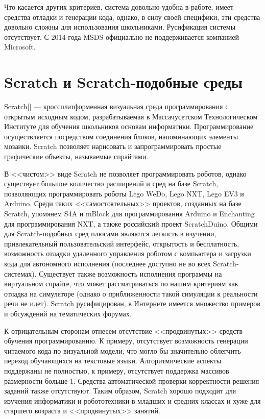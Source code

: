 \documentclass[a5paper]{article}
\begin{document}
Что касается других критериев, система довольно удобна в работе, имеет средства отладки и генерации кода, однако, 
в силу своей специфики, эти средства довольно сложны для использования школьниками. Русификация системы отсутствует. 
С 2014 года MSDS официально не поддерживается компанией Microsoft.

\section{Scratch и Scratch-подобные среды}

Scratch[] --- кроссплатформенная визуальная среда программирования с открытым исходным кодом, разрабатываемая 
в Массачусетском Технологическом Институте для обучения школьников основам информатики. Программирование 
осуществляется посредством соединения блоков, напоминающих элементы мозаики. Scratch позволяет нарисовать 
и запрограммировать простые графические объекты, называемые спрайтами. 

В <<чистом>> виде Scratch не позволяет программировать роботов, однако существует большое количество расширений и 
сред на базе Scratch, позволяющих программировать роботы Lego WeDo, Lego NXT, Lego EV3 и Arduino.  Среди таких 
<<самостоятельных>> проектов, созданных на базе Scratch, упомянем S4A и mBlock для программирования Arduino и 
Enchanting для программирования NXT, а также российский проект ScratchDuino. Общими для Scratch-подобных 
сред плюсами являются легкость в изучении, привлекательный пользовательский интерфейс, открытость и бесплатность, 
возможность отладки удаленного управления роботом с компьютера и загрузки кода для автономного исполнения 
(последнее доступно не во всех Scratch-системах). Существует также возможность исполнения программы на виртуальном 
спрайте, что может рассматриваться по нашим критериям как отладка на симуляторе (однако о приближенности такой 
симуляции к реальности речи не идет). Scratch русифицирован, в Интернете имеется множество примеров 
и обсуждений на тематических форумах. 

К отрицательным сторонам отнесем отсутствие <<продвинутых>> средств обучения программированию. К примеру, 
отсутствует возможность генерации читаемого кода по визуальной модели, что могло бы значительно облегчить 
переход обучающихся на текстовые языки. Алгоритмические аспекты поддержаны не полностью, к примеру, 
отсутствует поддержка массивов размерности больше 1. Средства автоматической проверки корректности решения 
заданий также отсутствуют. Таким образом, Scratch хорошо подходит для изучения информатики и робототехники 
в младших и средних классах и хуже для старшего возраста и <<продвинутых>> занятий.
\end{document}
